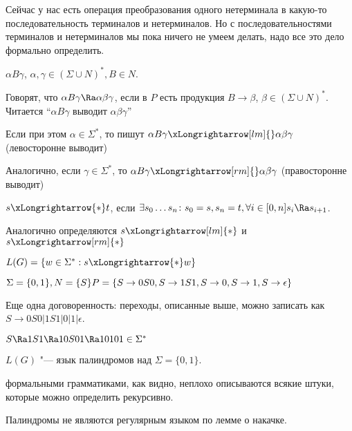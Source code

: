 Сейчас у нас есть операция преобразования одного нетерминала в какую-то последовательность терминалов и нетерминалов. 
Но с последовательностями терминалов и нетерминалов мы пока ничего не умеем делать, надо все это дело формально определить.

\begin{Def}        
    $\alpha B \gamma$, $\alpha, \gamma \in (\Sigma \cup N)^*, B \in N$.

    Говорят, что $\alpha B \gamma \Ra \alpha \beta \gamma$, если в $P$ есть продукция $B \to \beta$, $\beta \in (\Sigma \cup N)^*$. 
    Читается ``$\alpha B \gamma$ выводит $\alpha \beta \gamma$''
\end{Def}

\begin{Def}
    Если при этом $\alpha \in \Sigma^*$, то пишут
    $\alpha B \gamma \xLongrightarrow[lm]{} \alpha \beta \gamma$ (левосторонне выводит)

    Аналогично, если $\gamma \in \Sigma^*$, то
    $\alpha B \gamma \xLongrightarrow[rm]{} \alpha \beta \gamma$ (правосторонне выводит)
\end{Def}

\begin{Def}
$s \xLongrightarrow{*} t$, если $\exists s_0\dots s_n \colon s_0 = s, s_n = t, \forall i \in [0, n] s_i \Ra s_{i+1}$.

Аналогично определяются $s \xLongrightarrow[lm]{*}$ и $s \xLongrightarrow[rm]{*}$
\end{Def}

\begin{Def}
$L(G) = \{w \in \Sigma^*: s \xLongrightarrow{*} w\}$
\end{Def}

\begin{exmp}
$\Sigma = \{0, 1\}, N = \{S\} \\
P = \{S \to 0S0, S \to 1S1, S \to 0, S \to 1, S \to \epsilon\}$

Еще одна договоренность: переходы, описанные выше, можно записать как $S \to 0S0|1S1|0|1|\epsilon$.

$S \Ra 1S1 \Ra 10S01 \Ra 10101 \in \Sigma^*$

$L(G)$ "--- язык палиндромов над $\Sigma = \{0, 1\}$.

формальными грамматиками, как видно, неплохо описываются всякие штуки, которые можно определить рекурсивно.
\end{exmp}
\begin{Rem}
Палиндромы не являются регулярным языком по лемме о накачке.
\end{Rem}


